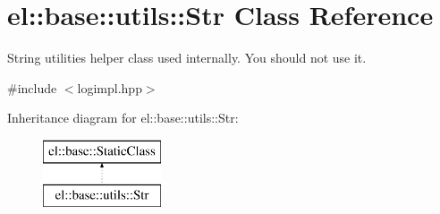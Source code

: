 \hypertarget{classel_1_1base_1_1utils_1_1Str}{\section{el\-:\-:base\-:\-:utils\-:\-:Str Class Reference}
\label{classel_1_1base_1_1utils_1_1Str}
}


String utilities helper class used internally. You should not use it.  




{\ttfamily \#include $<$logimpl.\-hpp$>$}

Inheritance diagram for el\-:\-:base\-:\-:utils\-:\-:Str\-:\begin{figure}[H]
\begin{center}
\leavevmode
\includegraphics[height=2.000000cm]{classel_1_1base_1_1utils_1_1Str}
\end{center}
\end{figure}
